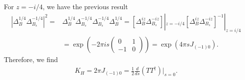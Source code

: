 \documentclass[a4paper,11pt]{article}
\theoremstyle{definition}
\newcommand{\nn}{\nonumber}
\begin{document}
For $z = -i/4$, we have the previous result %
\begin{align}
    \left|\Delta_{B}^{1/4}\Delta_{B_s}^{-1/4}\right|^2 =& \Delta_{B}^{1/4}\Delta_{B_s}^{-1/4}\Delta_{B_s}^{-1/4}\Delta_{B}^{1/4} = 
     \left[\Delta_{B}^{iz}\Delta_{B_s}^{-iz}\right]|_{z=-i/4}\left[\Delta_{B}^{iz}\Delta_{B_s}^{-iz}\right]^{-1}|_{z=i/4}\\
    &=\exp\left(-2\pi is \begin{pmatrix}0 & 1 \\-1 & 0\end{pmatrix}\right) = \exp(4\pi s J_{(-1)0}).
\end{align}
Therefore, we find 
\begin{eqnarray}
    K_H=2\pi J_{(-1)0}=\frac{1}{2}\frac{d}{ds} (TT^\dagger)\Big|_{s=0}.
\end{eqnarray}
\end{document}
